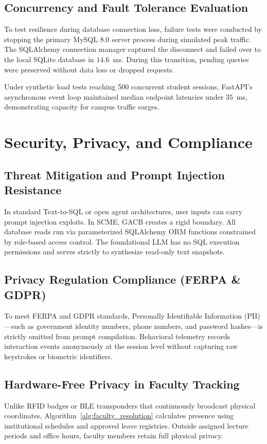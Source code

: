 \documentclass[conference]{IEEEtran}
\begin{document}
\subsection{Concurrency and Fault Tolerance Evaluation}
To test resilience during database connection loss, failure tests were conducted by stopping the primary MySQL 8.0 server process during simulated peak traffic. The SQLAlchemy connection manager captured the disconnect and failed over to the local SQLite database in $14.6$~ms. During this transition, pending queries were preserved without data loss or dropped requests.

Under synthetic load tests reaching 500 concurrent student sessions, FastAPI's asynchronous event loop maintained median endpoint latencies under $35$~ms, demonstrating capacity for campus traffic surges.

\section{Security, Privacy, and Compliance}
\label{sec:security}

\subsection{Threat Mitigation and Prompt Injection Resistance}
In standard Text-to-SQL or open agent architectures, user inputs can carry prompt injection exploits. In SCME, GACB creates a rigid boundary. All database reads run via parameterized SQLAlchemy ORM functions constrained by role-based access control. The foundational LLM has no SQL execution permissions and serves strictly to synthesize read-only text snapshots.

\subsection{Privacy Regulation Compliance (FERPA \& GDPR)}
To meet FERPA and GDPR standards, Personally Identifiable Information (PII)---such as government identity numbers, phone numbers, and password hashes---is strictly omitted from prompt compilation. Behavioral telemetry records interaction events anonymously at the session level without capturing raw keystrokes or biometric identifiers.

\subsection{Hardware-Free Privacy in Faculty Tracking}
Unlike RFID badges or BLE transponders that continuously broadcast physical coordinates, Algorithm~\ref{alg:faculty_resolution} calculates presence using institutional schedules and approved leave registries. Outside assigned lecture periods and office hours, faculty members retain full physical privacy.
\end{document}
